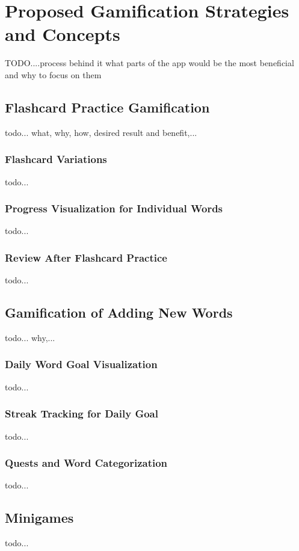 \chapter{Proposed Gamification Strategies and Concepts}

TODO....process behind it
what parts of the app would be the most beneficial and why to focus on them

\section{Flashcard Practice Gamification}

todo... what, why, how, desired result and benefit,...


\subsection{Flashcard Variations}

todo...

\subsection{Progress Visualization for Individual Words}

todo...

\subsection{Review After Flashcard Practice}

todo...

\section{Gamification of Adding New Words}

todo... why,...

\subsection{Daily Word Goal Visualization}

todo...

\subsection{Streak Tracking for Daily Goal}

todo...

\subsection{Quests and Word Categorization}

todo...

\section{Minigames}

todo...


